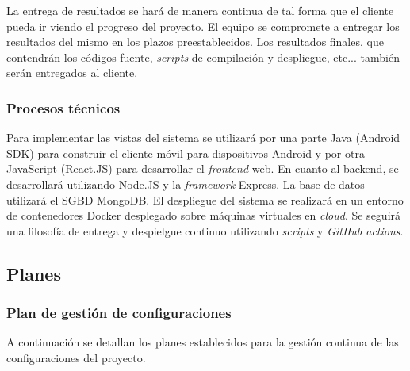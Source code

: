 \documentclass{article}
\begin{document}

La entrega de resultados se hará de manera continua de tal forma que el cliente pueda ir viendo el progreso del proyecto. 
El equipo se compromete a entregar los resultados del mismo en los plazos preestablecidos. 
Los resultados finales, que contendrán los códigos fuente, \textit{scripts} de compilación y despliegue, etc... también serán entregados al cliente.

\subsubsection{Procesos técnicos}
Para implementar las vistas del sistema se utilizará por una parte Java (Android SDK) para construir el cliente móvil para dispositivos Android 
y por otra JavaScript (React.JS) para desarrollar el \textit{frontend} web.
En cuanto al backend, se desarrollará utilizando Node.JS y la \textit{framework} Express. La base de datos utilizará el SGBD MongoDB.
El despliegue del sistema se realizará en un entorno de contenedores Docker desplegado sobre máquinas virtuales en \textit{cloud}.
Se seguirá una filosofía de entrega y despielgue continuo utilizando \textit{scripts} y \textit{GitHub actions}.
\subsection{Planes}

\subsubsection{Plan de gestión de configuraciones}
A continuación se detallan los planes establecidos para la gestión continua de las configuraciones del 
proyecto.
\end{document}
